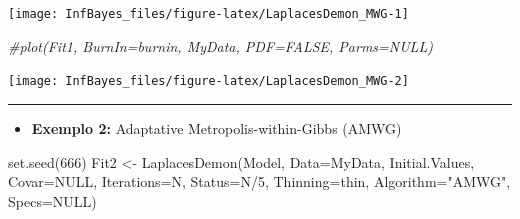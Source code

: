 \documentclass[
]{book}
\newenvironment{Shaded}{\begin{snugshade}}{\end{snugshade}}
\newcommand{\AttributeTok}[1]{\textcolor[rgb]{0.77,0.63,0.00}{#1}}
\newcommand{\CommentTok}[1]{\textcolor[rgb]{0.56,0.35,0.01}{\textit{#1}}}
\newcommand{\ConstantTok}[1]{\textcolor[rgb]{0.00,0.00,0.00}{#1}}
\newcommand{\DecValTok}[1]{\textcolor[rgb]{0.00,0.00,0.81}{#1}}
\newcommand{\FunctionTok}[1]{\textcolor[rgb]{0.00,0.00,0.00}{#1}}
\newcommand{\NormalTok}[1]{#1}
\newcommand{\OtherTok}[1]{\textcolor[rgb]{0.56,0.35,0.01}{#1}}
\newcommand{\SpecialCharTok}[1]{\textcolor[rgb]{0.00,0.00,0.00}{#1}}
\newcommand{\StringTok}[1]{\textcolor[rgb]{0.31,0.60,0.02}{#1}}
\providecommand{\tightlist}{%
  \setlength{\itemsep}{0pt}\setlength{\parskip}{0pt}}
\begin{document}
\begin{Shaded}
\end{Shaded}

\begin{center}\texttt{[image: InfBayes\_files/figure-latex/LaplacesDemon\_MWG-1]} \end{center}

\begin{Shaded}
\begin{Highlighting}[]
\CommentTok{\#plot(Fit1, BurnIn=burnin, MyData, PDF=FALSE, Parms=NULL)}
\end{Highlighting}
\end{Shaded}

\begin{center}\texttt{[image: InfBayes\_files/figure-latex/LaplacesDemon\_MWG-2]} \end{center}

\begin{center}\rule{0.5\linewidth}{0.5pt}\end{center}

\begin{itemize}
\tightlist
\item
  \textbf{Exemplo 2:} Adaptative Metropolis-within-Gibbs (AMWG)
\end{itemize}

\begin{Shaded}
\begin{Highlighting}[]
\FunctionTok{set.seed}\NormalTok{(}\DecValTok{666}\NormalTok{)}
\NormalTok{Fit2 }\OtherTok{\textless{}{-}} \FunctionTok{LaplacesDemon}\NormalTok{(Model, }\AttributeTok{Data=}\NormalTok{MyData, Initial.Values,}
  \AttributeTok{Covar=}\ConstantTok{NULL}\NormalTok{, }\AttributeTok{Iterations=}\NormalTok{N, }\AttributeTok{Status=}\NormalTok{N}\SpecialCharTok{/}\DecValTok{5}\NormalTok{, }\AttributeTok{Thinning=}\NormalTok{thin,}
  \AttributeTok{Algorithm=}\StringTok{"AMWG"}\NormalTok{, }\AttributeTok{Specs=}\ConstantTok{NULL}\NormalTok{)}
\end{Highlighting}
\end{Shaded}
\end{document}
